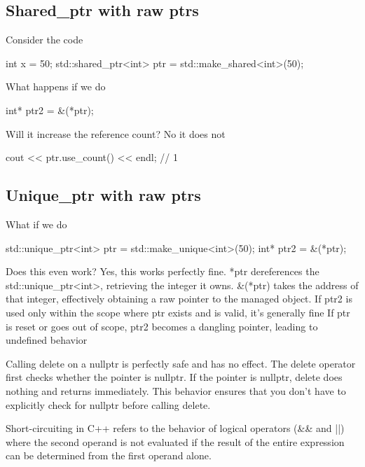 \documentclass{report}
\begin{document}
    \subsection{Shared\_ptr with raw ptrs}
    \bigbreak \noindent 
    Consider the code
    \bigbreak \noindent 
    \begin{cppcode}
    int x = 50;
    std::shared_ptr<int> ptr = std::make_shared<int>(50);
    \end{cppcode}
    \bigbreak \noindent 
    What happens if we do
    \bigbreak \noindent 
    \begin{cppcode}
        int* ptr2 = &(*ptr);
    \end{cppcode}
    \bigbreak \noindent 
    Will it increase the reference count? No it does not
    \bigbreak \noindent 
    \begin{cppcode}
        cout << ptr.use_count() << endl; // 1
    \end{cppcode}
    \bigbreak \noindent 
    \subsection{Unique\_ptr with raw ptrs}
    \bigbreak \noindent 
    What if we do
    \bigbreak \noindent 
    \begin{cppcode}
        std::unique_ptr<int> ptr = std::make_unique<int>(50);
        int* ptr2 = &(*ptr);
    \end{cppcode}
    \bigbreak \noindent 
    Does this even work? Yes, this works perfectly fine. *ptr dereferences the std::unique\_ptr<int>, retrieving the integer it owns. \&(*ptr) takes the address of that integer, effectively obtaining a raw pointer to the managed object.
    \bigbreak \noindent 
    If ptr2 is used only within the scope where ptr exists and is valid, it's generally fine
    \bigbreak \noindent 
    If ptr is reset or goes out of scope, ptr2 becomes a dangling pointer, leading to undefined behavior

    \pagebreak 
    \bigbreak \noindent 
     Calling delete on a nullptr is perfectly safe and has no effect.
     \bigbreak \noindent 
     The delete operator first checks whether the pointer is nullptr. If the pointer is nullptr, delete does nothing and returns immediately.
     \bigbreak \noindent 
    This behavior ensures that you don’t have to explicitly check for nullptr before calling delete.

    \pagebreak 
    \bigbreak \noindent 
    Short-circuiting in C++ refers to the behavior of logical operators (&& and ||) where the second operand is not evaluated if the result of the entire expression can be determined from the first operand alone.
    \bigbreak \noindent 
\end{document}

